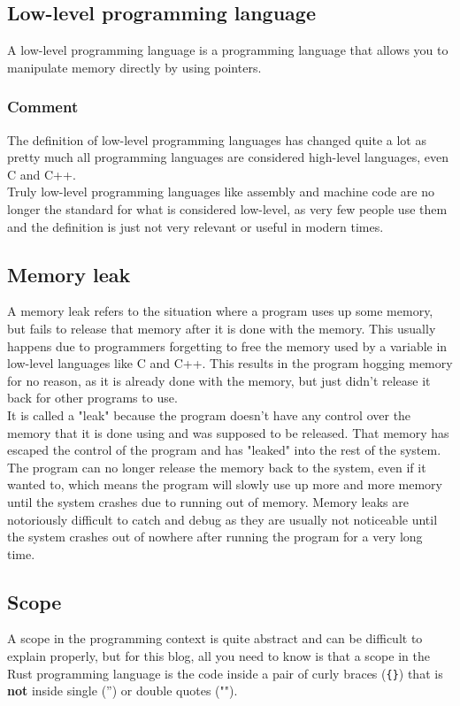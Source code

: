 \documentclass[11pt]{article}
\begin{document}
\subsection{Low-level programming language}
\label{sec:orgf0afedc}
A low-level programming language is a programming language
that allows you to manipulate memory directly by using
pointers.

\subsubsection{Comment}
\label{sec:org490cbda}
The definition of low-level programming languages
has changed quite a lot as pretty much all programming
languages are considered high-level languages, even C
and C++.  \\

Truly low-level programming languages like assembly and machine code
are no longer the standard for what is considered low-level,
as very few people use them and the definition is just not
very relevant or useful in modern times.

\subsection{Memory leak}
\label{sec:org5127c78}
A memory leak refers to the situation where a program uses up
some memory, but fails to release that memory after it
is done with the memory. This usually happens due to
programmers forgetting to free the memory used by a
variable in low-level languages like C and C++.
This results in the program hogging memory for
no reason, as it is already done with the memory,
but just didn't release it back for other programs to use.  \\

It is called a "leak" because the program doesn't have any
control over the memory that it is done using
and was supposed to be released. That memory has escaped
the control of the program and has "leaked" into the
rest of the system. The program can no longer release
the memory back to the system, even if it wanted to,
which means the program will slowly use up more and
more memory until the system crashes due to running out
of memory. Memory leaks are notoriously difficult
to catch and debug as they are usually not noticeable
until the system crashes out of nowhere after running
the program for a very long time.

\subsection{Scope}
\label{sec:org4b5fb86}
A scope in the programming context is quite abstract
and can be difficult to explain properly, but
for this blog, all you need to know is that a
scope in the Rust programming language is the
code inside a pair of curly braces (\texttt{\{\}}) that
is \textbf{not} inside single ('') or double quotes ("").
\end{document}
